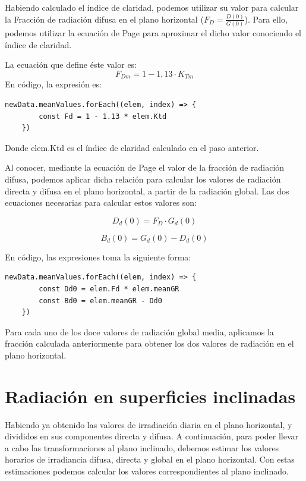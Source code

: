 Habiendo calculado el índice de claridad, podemos utilizar su valor para calcular la Fracción de radiación difusa en el plano horizontal ($F_D=\frac{D(0)}{G(0)}$). Para ello, podemos utilizar la ecuación de Page para aproximar el dicho valor conociendo el índice de claridad.

La ecuación que define éste valor es:
\begin{equation}\label{eqn:page}
F_{Dm}=1-1,13·K_{Tm}
\end{equation}
En código, la expresión es:
\begin{lstlisting}[style=ES6, caption={Fracción de difusa}]
	newData.meanValues.forEach((elem, index) => {
		const Fd = 1 - 1.13 * elem.Ktd
	})
\end{lstlisting}
Donde elem.Ktd es el índice de claridad calculado en el paso anterior.

Al conocer, mediante la ecuación de Page el valor de la fracción de radiación difusa, podemos aplicar dicha relación para calcular los valores de radiación directa y difusa en el plano horizontal, a partir de la radiación global.
Las dos ecuaciones necesarias para calcular estos valores son:

\begin{equation}
\label{eqn:rad_difusa}
D_d(0) = F_D · G_d(0)
\end{equation}

\begin{equation}
\label{eqn:rad_directa}
B_d(0) = G_d(0) - D_d(0)
\end{equation}

En código, las expresiones toma la siguiente forma:
\begin{lstlisting}[style=ES6, caption={Radiación directa y difusa}]
	newData.meanValues.forEach((elem, index) => {
		const Dd0 = elem.Fd * elem.meanGR
		const Bd0 = elem.meanGR - Dd0
	})
\end{lstlisting}

Para cada uno de los doce valores de radiación global media, aplicamos la fracción calculada anteriormente para obtener los dos valores de radiación en el plano horizontal.

\section{Radiación en superficies inclinadas}

Habiendo ya obtenido las valores de irradiación diaria en el plano horizontal, y divididos en sus componentes directa y difusa.
A continuación, para poder llevar a cabo las transformaciones al plano inclinado, debemos estimar los valores horarios de irradiancia difusa, directa y global en el plano horizontal. Con estas estimaciones podemos calcular los valores correspondientes al plano inclinado.


